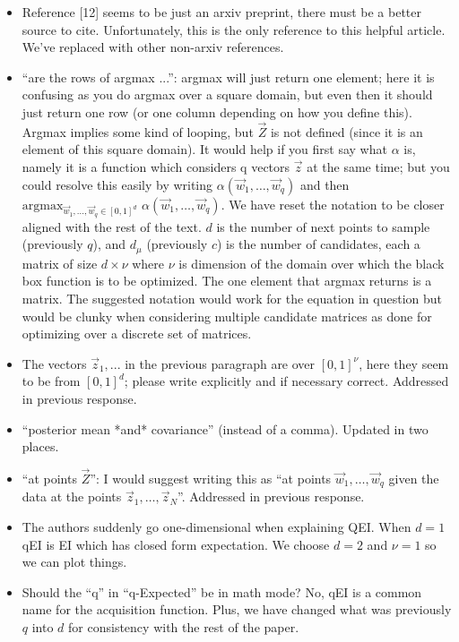 \documentclass{article}[12pt]
\newcommand{\Referee}[1]{{\color{blue} #1 \newline}}
\begin{document}
\begin{itemize}
    \item \Referee{Reference [12] seems to be just an arxiv preprint, there must be a better source to cite.}Unfortunately, this is the only reference to this helpful article. We've replaced with other non-arxiv references.
    \item \Referee{``are the rows of argmax ...'': argmax will just return one element; here it is confusing as you do argmax over a square domain, but even then it should just return one row (or one column depending on how you define this). Argmax implies some kind of looping, but $\vec{Z}$ is not defined (since it is an element of this square domain). It would help if you first say what $\alpha$ is, namely it is a function which considers q vectors $\vec{z}$ at the same time; but you could resolve this easily by writing $\alpha(\vec{w}_1, \ldots,\vec{w}_q)$ and then $\mathrm{argmax}_{\vec{w}_1,\ldots,\vec{w}_q \in [0, 1]^d}$ $\alpha(\vec{w}_1, \ldots, \vec{w}_q)$.}We have reset the notation to be closer aligned with the rest of the text. $d$ is the number of next points to sample (previously $q$), and $d_\mu$ (previously $c$) is the number of candidates, each a matrix of size $d \times \nu$ where $\nu$ is dimension of the domain over which the black box function is to be optimized. The one element that argmax returns is a matrix. The suggested notation would work for the equation in question but would be clunky when considering multiple candidate matrices as done for optimizing over a discrete set of matrices. 
    \item \Referee{The vectors $\vec{z}_1, ...$ in the previous paragraph are over $[0, 1]^\nu$, here they seem to be from $[0, 1]^d$; please write explicitly and if necessary correct.}Addressed in previous response. 
    \item \Referee{``posterior mean *and* covariance'' (instead of a comma).}Updated in two places. 
    \item \Referee{``at points $\vec{Z}$'': I would suggest writing this as ``at points $\vec{w}_1,\ldots,\vec{w}_q$ given the data at the points $\vec{z}_1,\ldots,\vec{z}_N$''.}Addressed in previous response.
    \item \Referee{The authors suddenly go one-dimensional when explaining QEI.}When $d=1$ qEI is EI which has closed form expectation. We choose $d=2$ and $\nu=1$ so we can plot things. 
    \item \Referee{Should the ``q'' in ``q-Expected'' be in math mode?}No, qEI is a common name for the acquisition function. Plus, we have changed what was previously $q$ into $d$ for consistency with the rest of the paper. 

\end{itemize}
\end{document}
